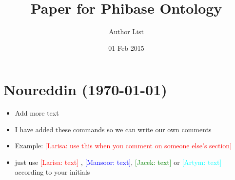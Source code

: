 \documentclass[a4paper,12pt, english]{article}
\newcommand{\kibitz}[2]{\ifnum\Comments=1\textcolor{#1}{#2}\fi}
\newcommand{\ls}[1]{\kibitz{red}      {[Larisa: #1]}}
\newcommand{\ms}[1]  {\kibitz{blue}   {[Mansoor: #1]}}
\newcommand{\jg}[1]{\kibitz{green}     {[Jacek: #1]}}
\newcommand{\al}[1]{\kibitz{cyan}     {[Artym: #1]}}
\begin{document}
\title{Paper for Phibase Ontology}
\date{01 Feb 2015}
\author{Author List}
\maketitle

\large
\section{Noureddin (\today)}
\begin{itemize}
	\item Add more text
	\item I have added these commands so we can write our own comments
	\item Example: \ls{use this when you comment on someone else's section}
	\item just use \ls{text} , \ms{text}, \jg{text} or \al{text} according to your initials
	
\end{itemize}  


		
\end{document}
